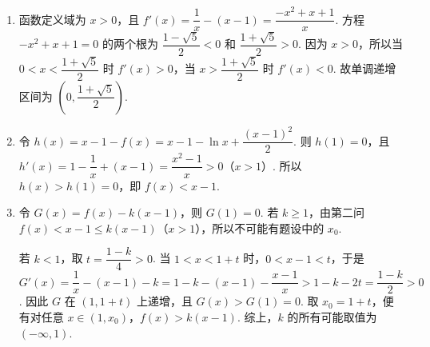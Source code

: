 \begin{solution}
\begin{enumerate}
\item 函数定义域为 \(x>0\)，且
\(f'(x)=\dfrac1x-(x-1)=\dfrac{-x^2+x+1}{x}\).
方程 \(-x^2+x+1=0\) 的两个根为 \(\dfrac{1-\sqrt5}{2}<0\) 和 \(\dfrac{1+\sqrt5}{2}>0\). 因为 \(x>0\)，所以当 \(0<x<\dfrac{1+\sqrt5}{2}\) 时 \(f'(x)>0\)，当 \(x>\dfrac{1+\sqrt5}{2}\) 时 \(f'(x)<0\). 故单调递增区间为 \(\left(0,\dfrac{1+\sqrt5}{2}\right)\).
\item 令 \(h(x)=x-1-f(x)=x-1-\ln x+\dfrac{(x-1)^2}{2}\). 则 \(h(1)=0\)，且
\(h'(x)=1-\dfrac1x+(x-1)=\dfrac{x^2-1}{x}>0\)（\(x>1\)）. 所以 \(h(x)>h(1)=0\)，即 \(f(x)<x-1\).
\item 令 \(G(x)=f(x)-k(x-1)\)，则 \(G(1)=0\).
若 \(k\geqslant1\)，由第二问 \(f(x)<x-1\leqslant k(x-1)\)（\(x>1\)），所以不可能有题设中的 \(x_0\).

若 \(k<1\)，取 \(t=\dfrac{1-k}{4}>0\). 当 \(1<x<1+t\) 时，\(0<x-1<t\)，于是
\(G'(x)=\dfrac1x-(x-1)-k=1-k-(x-1)-\dfrac{x-1}{x}>1-k-2t=\dfrac{1-k}{2}>0\).
因此 \(G\) 在 \((1,1+t)\) 上递增，且 \(G(x)>G(1)=0\). 取 \(x_0=1+t\)，便有对任意 \(x\in(1,x_0)\)，\(f(x)>k(x-1)\). 综上，\(k\) 的所有可能取值为 \((-\infty,1)\).
\end{enumerate}
\end{solution}
